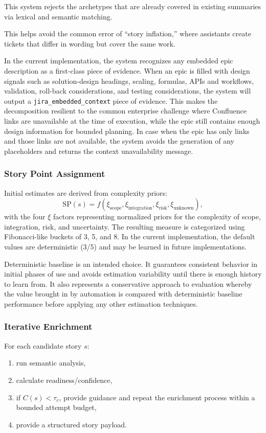 \documentclass[pdflatex,sn-basic]{sn-jnl}
\begin{document}
This system rejects the archetypes that are already covered in existing summaries via lexical and semantic matching.

This helps avoid the common error of ``story inflation,'' where assistants create tickets that differ in wording but cover the same work.

In the current implementation, the system recognizes any embedded epic description as a first-class piece of evidence. When an epic is filled with design signals such as solution-design headings, scaling, formulas, APIs and workflows, validation, roll-back considerations, and testing considerations, the system will output a \texttt{jira\_embedded\_context} piece of evidence. This makes the decomposition resilient to the common enterprise challenge where Confluence links are unavailable at the time of execution, while the epic still contains enough design information for bounded planning. In case when the epic has only links and those links are not available, the system avoids the generation of any placeholders and returns the context unavailability message.

\subsubsection{Story Point Assignment}
Initial estimates are derived from complexity priors:
\begin{equation}
\mathrm{SP}(s) = f(\xi_{\text{scope}}, \xi_{\text{integration}}, \xi_{\text{risk}}, \xi_{\text{unknown}}),
\end{equation}
with the four $\xi$ factors representing normalized priors for the complexity of scope, integration, risk, and uncertainty. The resulting measure is categorized using Fibonacci-like buckets of 3, 5, and 8. In the current implementation, the default values are deterministic (3/5) and may be learned in future implementations.

Deterministic baseline is an intended choice. It guarantees consistent behavior in initial phases of use and avoids estimation variability until there is enough history to learn from. It also represents a conservative approach to evaluation whereby the value brought in by automation is compared with deterministic baseline performance before applying any other estimation techniques.

\subsubsection{Iterative Enrichment}
For each candidate story $s$:
\begin{enumerate}
  \item run semantic analysis,
  \item calculate readiness/confidence,
  \item if $C(s)<\tau_c$, provide guidance and repeat the enrichment process within a bounded attempt budget,
  \item provide a structured story payload.
\end{enumerate}
\end{document}
